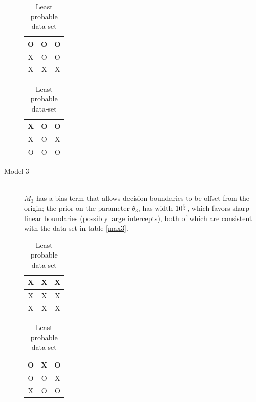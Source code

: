 \documentclass[a4paper,11pt]{article}
\theoremstyle{mytheor}
\begin{document}
\begin{description}
\begin{table}[h]
    \caption{Model 2}
    \begin{minipage}{.5\linewidth}
      \caption{Most probable data-set}
      \label{max2}
      \centering
        \begin{tabular}{c|c|c}
          O & O & O \\
          \hline
          X & O & O \\
          \hline
          X & X & X
        \end{tabular}
    \end{minipage}%
    \begin{minipage}{.5\linewidth}
      \centering
        \caption{Least probable data-set}
        \label{min2}
        \begin{tabular}{c|c|c}
          X & O & O \\
          \hline
          X & O & X \\
          \hline
          O & O & O
        \end{tabular}
    \end{minipage} 
\end{table}
\item[Model 3] \hfill \\
$M_3$ has a bias term that allows decision boundaries to be offset from the origin; the prior on
the parameter $\theta_3$, has width $10^{3\over2}$, which favors sharp linear boundaries (possibly large intercepts), both of which are consistent with the data-set in table \ref{max3}.
\begin{table}[h]
    \caption{Model 3}
    \begin{minipage}{.5\linewidth}
      \caption{Most probable data-set}
      \label{max3}
      \centering
        \begin{tabular}{c|c|c}
          X & X & X \\
          \hline
          X & X & X \\
          \hline
          X & X & X
        \end{tabular}
    \end{minipage}%
    \begin{minipage}{.5\linewidth}
      \centering
        \caption{Least probable data-set}
        \label{min3}
        \begin{tabular}{c|c|c}
          O & X & O \\
          \hline
          O & O & X \\
          \hline
          X & O & O
        \end{tabular}
    \end{minipage} 
\end{table}

\end{description}
\end{document}

